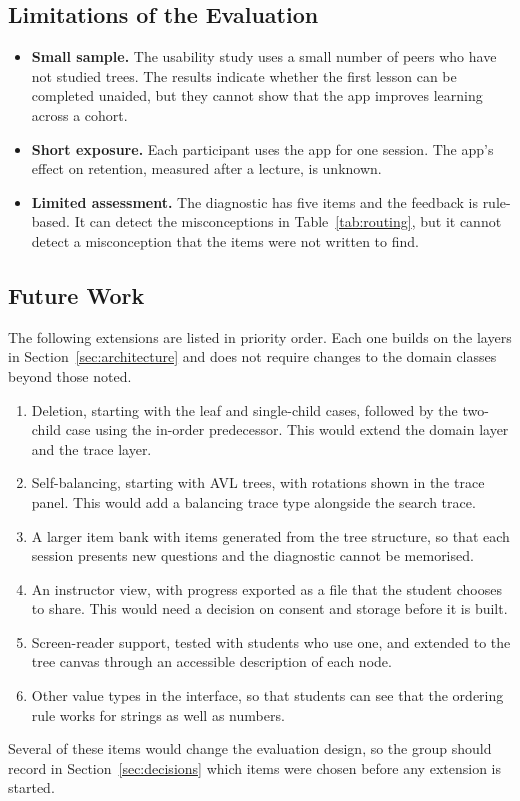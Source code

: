 \subsection{Limitations of the Evaluation}
\begin{itemize}
    \item \textbf{Small sample.} The usability study uses a small number of peers who have not studied trees. The results indicate whether the first lesson can be completed unaided, but they cannot show that the app improves learning across a cohort.
    \item \textbf{Short exposure.} Each participant uses the app for one session. The app's effect on retention, measured after a lecture, is unknown.
    \item \textbf{Limited assessment.} The diagnostic has five items and the feedback is rule-based. It can detect the misconceptions in Table~\ref{tab:routing}, but it cannot detect a misconception that the items were not written to find.
\end{itemize}

\subsection{Future Work}
The following extensions are listed in priority order. Each one builds on the layers in Section~\ref{sec:architecture} and does not require changes to the domain classes beyond those noted.

\begin{enumerate}
    \item Deletion, starting with the leaf and single-child cases, followed by the two-child case using the in-order predecessor. This would extend the domain layer and the trace layer.
    \item Self-balancing, starting with AVL trees, with rotations shown in the trace panel. This would add a balancing trace type alongside the search trace.
    \item A larger item bank with items generated from the tree structure, so that each session presents new questions and the diagnostic cannot be memorised.
    \item An instructor view, with progress exported as a file that the student chooses to share. This would need a decision on consent and storage before it is built.
    \item Screen-reader support, tested with students who use one, and extended to the tree canvas through an accessible description of each node.
    \item Other value types in the interface, so that students can see that the ordering rule works for strings as well as numbers.
\end{enumerate}

Several of these items would change the evaluation design, so the group should record in Section~\ref{sec:decisions} which items were chosen before any extension is started.
